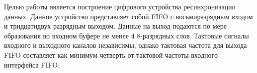 \Introduction



Целью работы является построение цифрового устройства ресинхронизации данных. Данное устройство представляет собой FIFO с восьмиразрядным входом и тридцатидвух разрядным выходом. Данные на выход подаются по мере образования во входном буфере не менее 4 8-разрядных слов. Тактовые сигналы входного и выходного каналов независимы, однако тактовая частота для выхода FIFO составляет как минимум  четверть от тактовой частоты входного интерфейса FIFO.


%
